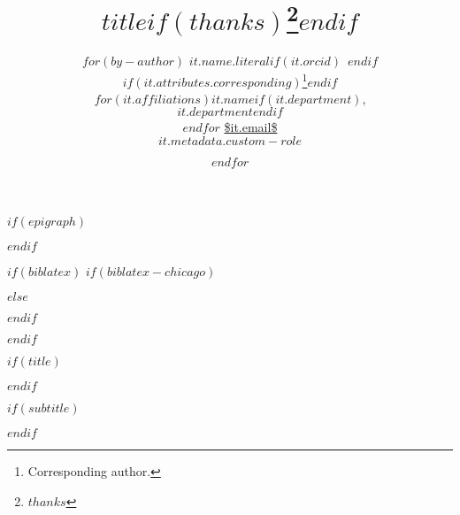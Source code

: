
$if(epigraph)$
\usepackage{epigraph}
\renewcommand{\epigraphsize}{\sffamily\footnotesize}
\setlength{\epigraphrule}{0em}
\setlength{\beforeepigraphskip}{-2em}
\setlength{\afterepigraphskip}{1em}
$endif$

$if(biblatex)$
$if(biblatex-chicago)$
\usepackage[$if(biblio-style)$$biblio-style$,$endif$$for(biblatexoptions)$$biblatexoptions$$sep$,$endfor$]{biblatex-chicago}
$else$
\usepackage[$if(biblio-style)$style=$biblio-style$,$endif$$for(biblatexoptions)$$biblatexoptions$$sep$,$endfor$]{biblatex}
$endif$

\setlength\bibitemsep{0pt}  %
\renewcommand*{\bibfont}{\footnotesize}  %
\setlength\bibhang{\parindent}  %



$endif$


\usepackage{orcidlink}  %

$if(title)$
\title{$title$$if(thanks)$\thanks{$thanks$}$endif$}
$endif$

$if(subtitle)$
\usepackage{etoolbox}
\makeatletter
\providecommand{\subtitle}[1]{%
  \apptocmd{\@title}{\par {\vskip 0.25em \large #1 \par}}{}{}
}
\makeatother
\subtitle{$subtitle$}
$endif$

\author{
    $for(by-author)$
    {\large $it.name.literal$$if(it.orcid)$~$endif$}%
    $if(it.attributes.corresponding)$\thanks{Corresponding author.}$endif$ \\
    $for(it.affiliations)$$it.name$$if(it.department)$,\\ $it.department$$endif$ \\$endfor$
    {\footnotesize \url{$it.email$}} \\
    {\textbf{$it.metadata.custom-role$}} \and
    $endfor$
}


\date{}


%
\usepackage{url}

\newpage

